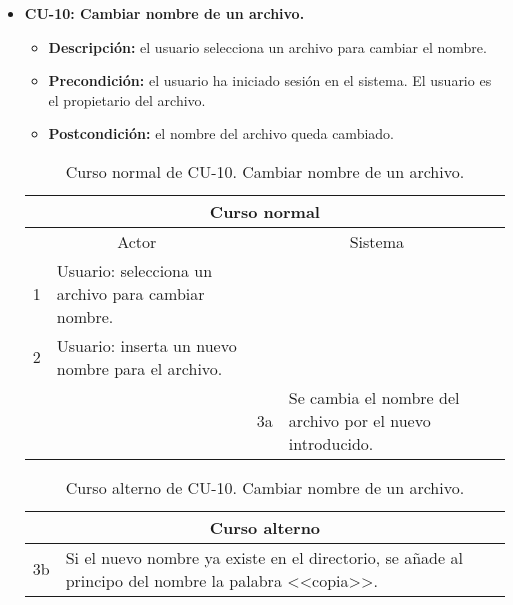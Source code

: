 \begin{itemize}
	\item \textbf{CU-10: Cambiar nombre de un archivo.}
	\begin{itemize}
		\item \textbf{Descripción:} el usuario selecciona un archivo para cambiar el nombre.
		\item \textbf{Precondición:} el usuario ha iniciado sesión en el sistema. El usuario es el propietario del archivo.
		\item \textbf{Postcondición:} el nombre del archivo queda cambiado.
	\end{itemize}
	\begin{table}[H]
		\centering
		\begin{tabular}{|p{0.3cm}|p{5cm}|p{0.3cm}|p{5cm}|}
			\hline
			\multicolumn{4}{|c|}{Curso normal} \\ \hline
			\multicolumn{2}{|c|}{Actor} & \multicolumn{2}{|c|}{Sistema} \\ \hline
			1 & Usuario: selecciona un archivo para cambiar nombre. &  &  \\ \hline
			2 & Usuario: inserta un nuevo nombre para el archivo. &  &  \\ \hline
			&  & 3a & Se cambia el nombre del archivo por el nuevo introducido. \\ \hline
		\end{tabular}
		\caption{Curso normal de CU-10. Cambiar nombre de un archivo.}
		\label{tabla:cu10-normal}
	\end{table}
	
	\begin{table}[H]
		\centering
		\begin{tabular}{|p{0.3cm}|p{10cm}|}
			\hline
			\multicolumn{2}{|c|}{Curso alterno} \\ \hline
			3b & Si el nuevo nombre ya existe en el directorio, se añade al principo del nombre la palabra <<copia>>. \\ \hline
		\end{tabular}
		\caption{Curso alterno de CU-10. Cambiar nombre de un archivo.}
		\label{tabla:cu10-alterno}
	\end{table}
\end{itemize}

